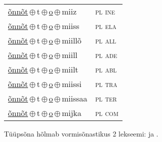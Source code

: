 \begin{minipage}{\textwidth}
\begin{sideways}
\begin{tabular}{l l}
\underline{õnnõt}\,$\oplus$\,t\,$\oplus$\,\underline{o}\,$\oplus$\,miiz & \textsc{ pl ine } \\
\underline{õnnõt}\,$\oplus$\,t\,$\oplus$\,\underline{o}\,$\oplus$\,miiss & \textsc{ pl ela } \\
\underline{õnnõt}\,$\oplus$\,t\,$\oplus$\,\underline{o}\,$\oplus$\,miillõ & \textsc{ pl all } \\
\underline{õnnõt}\,$\oplus$\,t\,$\oplus$\,\underline{o}\,$\oplus$\,miill & \textsc{ pl ade } \\
\underline{õnnõt}\,$\oplus$\,t\,$\oplus$\,\underline{o}\,$\oplus$\,miilt & \textsc{ pl abl } \\
\underline{õnnõt}\,$\oplus$\,t\,$\oplus$\,\underline{o}\,$\oplus$\,miissi & \textsc{ pl tra } \\
\underline{õnnõt}\,$\oplus$\,t\,$\oplus$\,\underline{o}\,$\oplus$\,miissaa & \textsc{ pl ter } \\
\underline{õnnõt}\,$\oplus$\,t\,$\oplus$\,\underline{o}\,$\oplus$\,mijka & \textsc{ pl com } \\
\end{tabular}
\end{sideways}
\label{tab:tüüpsõnamall-õnnõto}

\end{minipage}

 
\vspace{1em}
\noindent Tüüpsõna hõlmab vormisõnastikus 2 lekseemi:  ja .
